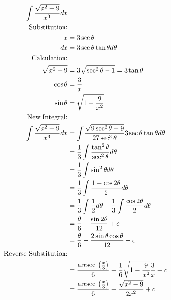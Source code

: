\documentclass[fleqn]{report}
\begin{document}
\begin{example}
\begin{align*}
\int \frac{\sqrt{x^2-9}}{x^3} dx & \\
\text{Substitution:} & \\
x & = 3 \sec \theta \\
dx & = 3 \sec \theta \tan \theta d \theta \\
\text{Calculation:} & \\
\sqrt{x^2-9} & = 3 \sqrt{\sec^2 \theta - 1} = 3 \tan \theta \\
\cos \theta & = \frac{3}{x} \\
\sin \theta & = \sqrt{1 - \frac{9}{x^2}} \\
\text{New Integral:} & \\
\int \frac{\sqrt{x^2-9}}{x^3} dx & = \int \frac{\sqrt{9 \sec^2 \theta -
9}}{27 \sec^3 \theta} 3 \sec \theta \tan \theta d \theta \\
& = \frac{1}{3} \int \frac{\tan^2
\theta}{\sec^2 \theta} d \theta \\
& = \frac{1}{3} \int \sin^2 \theta d\theta \\
& = \frac{1}{3} \int
\frac{1-\cos 2\theta}{2} d \theta \\
& = \frac{1}{3} \int \frac{1}{2}
d \theta - \frac{1}{3} \int \frac{\cos 2\theta}{2} d\theta \\
& = \frac{\theta}{6} - \frac{\sin 2\theta}{12} + c \\
& = \frac{\theta}{6} - \frac{2 \sin \theta \cos \theta}{12} + c \\
\text{Reverse Substitution:} & \\
& = \frac{\mathrm{arcsec\hspace{0.07cm}}\left(\frac{x}{3} \right)}{6} - \frac{1}{6}
\sqrt{1 - \frac{9}{x^2}} \frac{3}{x} + c \\
& = \frac{\mathrm{arcsec\hspace{0.07cm}}\left(\frac{x}{3} \right)}{6} -
\frac{\sqrt{x^2-9}}{2x^2} + c 
\end{align*}
\end{example}
\end{document}
